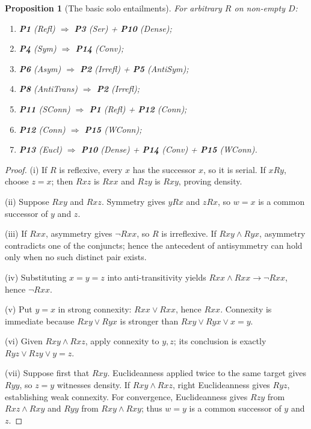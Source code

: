 \documentclass[11pt,a4paper,reqno]{amsart}
\newtheorem{proposition}{Proposition}[section]
\theoremstyle{definition}
\theoremstyle{remark}
\newcommand{\prop}[1]{\textbf{P#1}}
\newcommand{\pabbr}[1]{\textsf{#1}}
\newcommand{\catentails}{\Rightarrow}
\begin{document}
\begin{proposition}[The basic solo entailments]\label{prop:solo}
For arbitrary $R$ on non-empty $D$:
\begin{enumerate}[label=(\roman*),noitemsep]
\item \prop{1} (\pabbr{Refl}) $\catentails$
      \prop{3} (\pabbr{Ser}) + \prop{10} (\pabbr{Dense});
\item \prop{4} (\pabbr{Sym}) $\catentails$ \prop{14} (\pabbr{Conv});
\item \prop{6} (\pabbr{Asym}) $\catentails$
      \prop{2} (\pabbr{Irrefl}) + \prop{5} (\pabbr{AntiSym});
\item \prop{8} (\pabbr{AntiTrans}) $\catentails$ \prop{2} (\pabbr{Irrefl});
\item \prop{11} (\pabbr{SConn}) $\catentails$
      \prop{1} (\pabbr{Refl}) + \prop{12} (\pabbr{Conn});
\item \prop{12} (\pabbr{Conn}) $\catentails$ \prop{15} (\pabbr{WConn});
\item \prop{13} (\pabbr{Eucl}) $\catentails$
      \prop{10} (\pabbr{Dense}) + \prop{14} (\pabbr{Conv}) +
      \prop{15} (\pabbr{WConn}).
\end{enumerate}
\end{proposition}
\begin{proof}
(i) If $R$ is reflexive, every $x$ has the successor $x$, so it is serial.  If
$xRy$, choose $z=x$; then $Rxz$ is $Rxx$ and $Rzy$ is $Rxy$, proving density.

(ii) Suppose $Rxy$ and $Rxz$.  Symmetry gives $yRx$ and $zRx$, so $w=x$ is a
common successor of $y$ and $z$.

(iii) If $Rxx$, asymmetry gives $\neg Rxx$, so $R$ is irreflexive.  If
$Rxy\wedge Ryx$, asymmetry contradicts one of the conjuncts; hence the
antecedent of antisymmetry can hold only when no such distinct pair exists.

(iv) Substituting $x=y=z$ into anti-transitivity yields
$Rxx\wedge Rxx\to\neg Rxx$, hence $\neg Rxx$.

(v) Put $y=x$ in strong connexity: $Rxx\vee Rxx$, hence $Rxx$.  Connexity is
immediate because $Rxy\vee Ryx$ is stronger than $Rxy\vee Ryx\vee x=y$.

(vi) Given $Rxy\wedge Rxz$, apply connexity to $y,z$; its conclusion is exactly
$Ryz\vee Rzy\vee y=z$.

(vii) Suppose first that $Rxy$.  Euclideanness applied twice to the same
target gives $Ryy$, so $z=y$ witnesses density.  If $Rxy\wedge Rxz$, right
Euclideanness gives $Ryz$, establishing weak connexity.  For convergence,
Euclideanness gives $Rzy$ from $Rxz\wedge Rxy$ and $Ryy$ from
$Rxy\wedge Rxy$; thus $w=y$ is a common successor of $y$ and $z$.
\end{proof}
\end{document}
